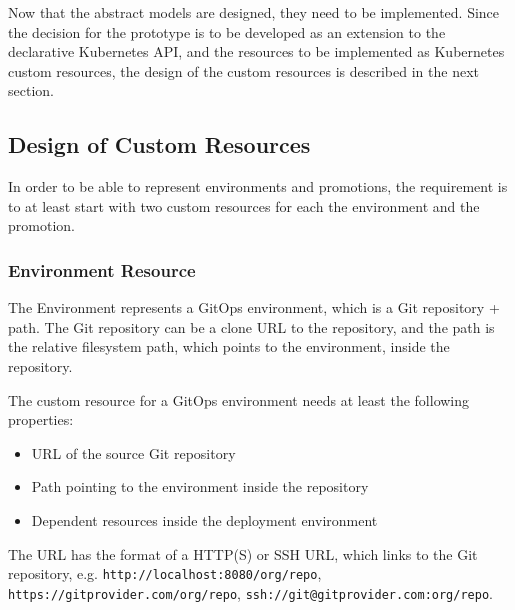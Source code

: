 Now that the abstract models are designed,
they need to be implemented.
Since the decision for the prototype is to be developed
as an extension to the declarative Kubernetes API,
and the resources to be implemented as Kubernetes custom resources,
the design of the custom resources is described in the next section.






\subsection{Design of Custom Resources}
\label{prototype:design:design-custom-resources}

In order to be able to represent environments and promotions,
the requirement is to at least start with two custom resources for each 
the environment and the promotion.

\subsubsection*{Environment Resource}

The Environment represents a GitOps environment,
which is a Git repository + path.
The Git repository can be a clone URL to the repository,
and the path is the relative filesystem path, which points to the 
environment, inside the repository.


The custom resource for a GitOps environment needs at least the following properties:

\begin{itemize}
	\item URL of the source Git repository
	\item Path pointing to the environment inside the repository
	\item Dependent resources inside the deployment environment
\end{itemize}

The URL has the format of a HTTP(S) or SSH URL,
which links to the Git repository, e.g.
\lstinline|http://localhost:8080/org/repo|,
\lstinline|https://gitprovider.com/org/repo|,
\lstinline|ssh://git@gitprovider.com:org/repo|.

